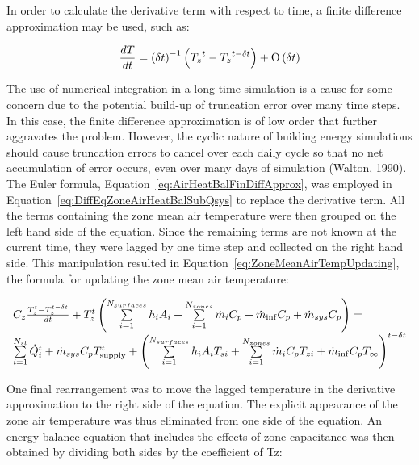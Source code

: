 In order to calculate the derivative term with respect to time, a finite difference approximation may be used, such as:

\begin{equation}
\frac{{dT}}{{dt}} = {\left( {\delta t} \right)^{ - 1}}\left( {{T_z}^t - {T_z}^{t - \delta t}} \right) + {\rm O}\left( {\delta t} \right)
\label{eq:AirHeatBalFinDiffApprox}
\end{equation}

The use of numerical integration in a long time simulation is a cause for some concern due to the potential build-up of truncation error over many time steps. In this case, the finite difference approximation is of low order that further aggravates the problem. However, the cyclic nature of building energy simulations should cause truncation errors to cancel over each daily cycle so that no net accumulation of error occurs, even over many days of simulation (Walton, 1990). The Euler formula, Equation~\ref{eq:AirHeatBalFinDiffApprox}, was employed in Equation~\ref{eq:DiffEqZoneAirHeatBalSubQsys} to replace the derivative term. All the terms containing the zone mean air temperature were then grouped on the left hand side of the equation. Since the remaining terms are not known at the current time, they were lagged by one time step and collected on the right hand side. This manipulation resulted in Equation~\ref{eq:ZoneMeanAirTempUpdating}, the formula for updating the zone mean air temperature:

\begin{equation}
\begin{array}{l}{C_z}\frac{{T_z^t - T_z^{t - \delta t}}}{{dt}} + T_z^t\left( {\sum\limits_{i = 1}^{{N_{surfaces}}} {{h_i}} {A_i} + \sum\limits_{i = 1}^{{N_{zones}}} {{{\dot m}_i}} {C_p} + {{\dot m}_{\inf }}{C_p} + {{\dot m}_{sys}}{C_p}} \right) = \\\sum\limits_{i = 1}^{{N_{sl}}} {\dot Q_i^t}  + {{\dot m}_{sys}}{C_p}T_{{\rm{supply}}}^t + {\left( {\sum\limits_{i = 1}^{{N_{surfaces}}} {{h_i}} {A_i}{T_{si}} + \sum\limits_{i = 1}^{{N_{zones}}} {{{\dot m}_i}} {C_p}{T_{zi}} + {{\dot m}_{\inf }}{C_p}{T_\infty }} \right)^{t - \delta t}}\end{array}
\label{eq:ZoneMeanAirTempUpdating}
\end{equation}

One final rearrangement was to move the lagged temperature in the derivative approximation to the right side of the equation. The explicit appearance of the zone air temperature was thus eliminated from one side of the equation. An energy balance equation that includes the effects of zone capacitance was then obtained by dividing both sides by the coefficient of Tz:

